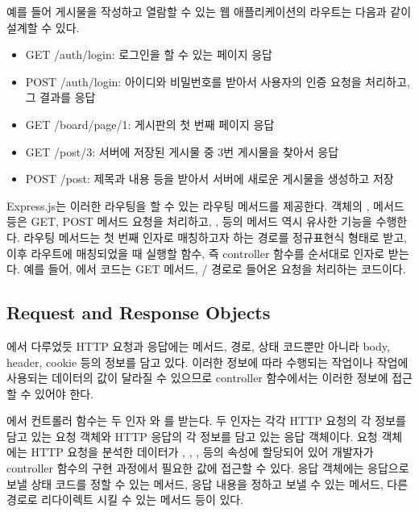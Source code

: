 예를 들어 게시물을 작성하고 열람할 수 있는 웹 애플리케이션의 라우트는 다음과 같이 설계할 수 있다.

\begin{itemize}
    \item GET /auth/login: 로그인을 할 수 있는 페이지 응답
    \item POST /auth/login: 아이디와 비밀번호를 받아서 사용자의 인증 요청을 처리하고, 그 결과를 응답
    \item GET /board/page/1: 게시판의 첫 번째 페이지 응답
    \item GET /post/3: 서버에 저장된 게시물 중 3번 게시물을 찾아서 응답
    \item POST /post: 제목과 내용 등을 받아서 서버에 새로운 게시물을 생성하고 저장
\end{itemize}

Express.js는 이러한 라우팅을 할 수 있는 라우팅 메서드를 제공한다.  객체의 ,  메서드 등은 GET, POST 메서드 요청을 처리하고, ,  등의 메서드 역시 유사한 기능을 수행한다. 라우팅 메서드는 첫 번째 인자로 매칭하고자 하는 경로를 정규표현식 형태로 받고, 이후 라우트에 매칭되었을 때 실행할 함수, 즉 controller 함수를 순서대로 인자로 받는다. 예를 들어, 에서  코드는 GET 메서드, / 경로로 들어온 요청을 처리하는 코드이다.

\subsection*{Request and Response Objects}

에서 다루었듯 HTTP 요청과 응답에는 메서드, 경로, 상태 코드뿐만 아니라 body, header, cookie 등의 정보를 담고 있다. 이러한 정보에 따라 수행되는 작업이나 작업에 사용되는 데이터의 값이 달라질 수 있으므로 controller 함수에서는 이러한 정보에 접근할 수 있어야 한다.

에서 컨트롤러 함수는 두 인자 와 를 받는다. 두 인자는 각각 HTTP 요청의 각 정보를 담고 있는 요청 객체와 HTTP 응답의 각 정보를 담고 있는 응답 객체이다. 요청 객체에는 HTTP 요청을 분석한 데이터가 , , ,  등의 속성에 할당되어 있어 개발자가 controller 함수의 구현 과정에서 필요한 값에 접근할 수 있다. 응답 객체에는 응답으로 보낼 상태 코드를 정할 수 있는  메서드, 응답 내용을 정하고 보낼 수 있는  메서드, 다른 경로로 리다이렉트 시킬 수 있는  메서드 등이 있다.

